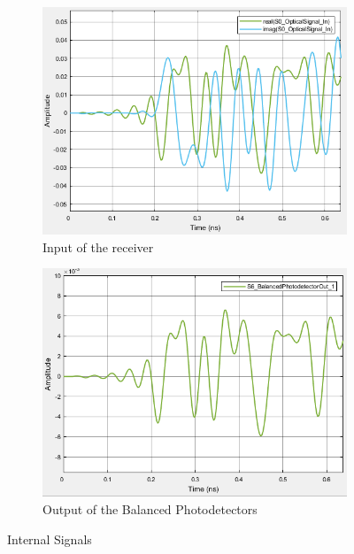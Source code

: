 \begin{figure}[H]
	\centering
	\begin{subfigure}{0.3\textwidth}
		\centering
		\includegraphics[scale=0.3]{../lib/m_qam_receiver/figures/Optical_in.png}
		\caption{Input of the receiver}
		\label{fig:optical_in}
	\end{subfigure}
	\begin{subfigure}{0.3\textwidth}
		\centering
		\includegraphics[scale=0.3]{./lib/m_qam_receiver/figures/balance_out.png}
		\caption{Output of the Balanced Photodetectors}
		\label{fig:bal_out}
	\end{subfigure}
	\caption{Internal Signals}
	\label{fig:internal_signals_part1}
\end{figure}


